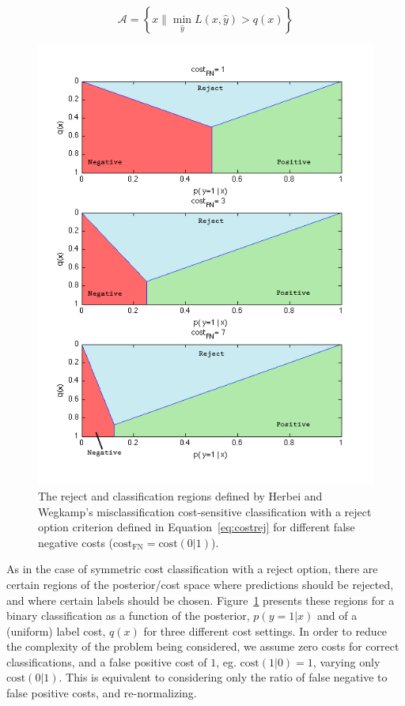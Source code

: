 \begin{equation}
\mathcal{A} = \left\{ x \| \min_{\hat{y}} L(x, \hat{y}) > q(x) \right\}
\label{eq:costrej}
\end{equation}

\begin{figure}[hbt!]
\begin{center}
\includegraphics[width= 0.6 \columnwidth]{plots/cost_reject_decision_bounds_fill.png}
\end{center}
\caption{The reject and classification regions defined by Herbei and Wegkamp's misclassification cost-sensitive classification with a reject option criterion defined in Equation~\ref{eq:costrej} for different false negative costs ($\mbox{cost}_{\mbox{FN}} = \mbox{cost}(0|1)$). }
\label{fig:costdecision}
\end{figure}

As in the case of symmetric cost classification with a reject option, there are certain regions of the posterior/cost space where predictions should be rejected, and where certain labels should be chosen. Figure~\ref{fig:costdecision} presents these regions for a binary classification as a function of the posterior, $p(y=1|x)$ and of a (uniform) label cost, $q(x)$ for three different cost settings. In order to reduce the complexity of the problem being considered, we assume zero costs for correct classifications, and a false positive cost of $1$, eg. $\mbox{cost}(1|0)=1$, varying only $\mbox{cost}(0|1)$. This is equivalent to considering only the ratio of false negative to false positive costs, and re-normalizing.
